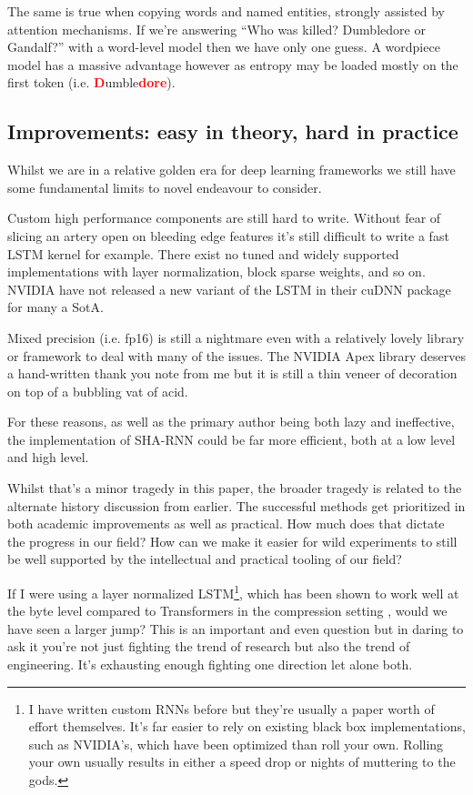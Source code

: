 \documentclass{article}
\begin{document}
The same is true when copying words and named entities, strongly assisted by attention mechanisms.
If we're answering ``Who was killed? Dumbledore or Gandalf?'' with a word-level model then we have only one guess.
A wordpiece model has a massive advantage however as entropy may be loaded mostly on the first token (i.e.
\textbf{\textcolor{red}{D}}umble\textbf{\textcolor{red}{dore}}).

\subsection{Improvements: easy in theory, hard in practice}

Whilst we are in a relative golden era for deep learning frameworks we still have some fundamental limits to novel endeavour to consider.

Custom high performance components are still hard to write.
Without fear of slicing an artery open on bleeding edge features it's still difficult to write a fast LSTM kernel for example.
There exist no tuned and widely supported implementations with layer normalization, block sparse weights, and so on.
NVIDIA have not released a new variant of the LSTM in their cuDNN package for many a SotA.

Mixed precision (i.e. fp16) is still a nightmare even with a relatively lovely library or framework to deal with many of the issues.
The NVIDIA Apex library deserves a hand-written thank you note from me but it is still a thin veneer of decoration on top of a bubbling vat of acid.

For these reasons, as well as the primary author being both lazy and ineffective, the implementation of SHA-RNN could be far more efficient, both at a low level and high level.

Whilst that's a minor tragedy in this paper, the broader tragedy is related to the alternate history discussion from earlier.
The successful methods get prioritized in both academic improvements as well as practical.
How much does that dictate the progress in our field?
How can we make it easier for wild experiments to still be well supported by the intellectual and practical tooling of our field?

If I were using a layer normalized LSTM\footnote{I have written custom RNNs before but they're usually a paper worth of effort themselves. It's far easier to rely on existing black box implementations, such as NVIDIA's, which have been optimized than roll your own. Rolling your own usually results in either a speed drop or nights of muttering to the  gods.}, which has been shown to work well at the byte level compared to Transformers in the compression setting \cite{bellard2019lossless}, would we have seen a larger jump?
This is an important and even question but in daring to ask it you're not just fighting the trend of research but also the trend of engineering.
It's exhausting enough fighting one direction let alone both.
\end{document}
